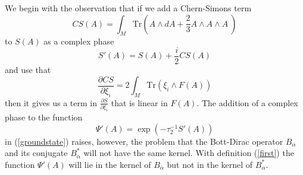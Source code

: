 \documentclass[letterpaper,11pt]{article}
\def\a{\alpha}
\newcommand{\pa}{\partial}
\begin{document}
We begin with the observation that if we add a Chern-Simons term 
\begin{equation}
CS(A) =  \int_M \mbox{Tr} \left( {A}\wedge d{A} + \frac{2}{3} {A}\wedge {A} \wedge {A}\  \right)
\label{CS}
\end{equation}
 to $S(A)$ as a complex phase
\begin{equation}
S'(A) =S(A) + \frac{{i}}{2} CS(A)
\label{first}
\end{equation}
and use that
\begin{equation}
\frac{\pa CS}{\pa \xi_i} =  2 \int_M \mbox{Tr}\left(\xi_i\wedge F(A)  \right)
\label{godhavn}
\end{equation}
then it gives us a term in $\frac{\pa S}{\pa \xi_i}$ that is linear in $F(A)$. The addition of a complex phase to the function 
\begin{equation}
\Psi'(A) =  \exp\left( - \tau_2^{-1} S'(A)  \right)
\label{groundstate2}
\end{equation}
in (\ref{groundstate}) raises, however, the problem that the Bott-Dirac operator $B_\a$ and its conjugate $B_\a^*$ will not have the same kernel. With definition (\ref{first}) the function $\Psi'(A)$ will lie in the kernel of $B_\a$ but not in the kernel of $B_\a^*$. 
\end{document}
